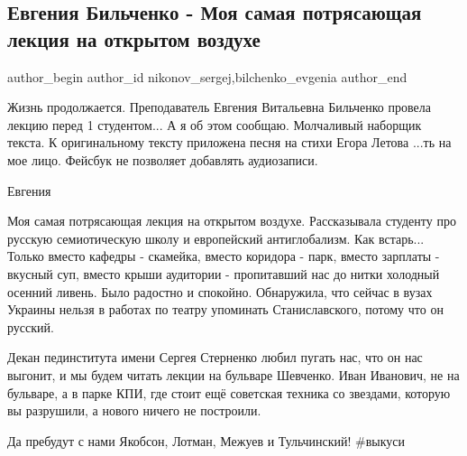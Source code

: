  
 
 
 
 
 
\subsection{Евгения Бильченко -  Моя самая потрясающая лекция на открытом воздухе}
\label{sec:13_09_2021.fb.nikonov_sergej.4.bilchenko_lekcia}
 
\ifcmt
 author_begin
   author_id nikonov_sergej,bilchenko_evgenia
 author_end
\fi

Жизнь продолжается. Преподаватель Евгения Витальевна Бильченко провела лекцию
перед 1 студентом... А я об этом сообщаю. Молчаливый наборщик текста.  К
оригинальному тексту приложена песня на стихи Егора Летова ...ть на мое лицо.
Фейсбук не позволяет добавлять аудиозаписи.

Евгения


Моя самая потрясающая лекция на открытом воздухе. Рассказывала студенту про
русскую семиотическую школу и европейский антиглобализм. Как встарь... Только
вместо кафедры - скамейка, вместо коридора - парк, вместо зарплаты - вкусный
суп, вместо крыши аудитории - пропитавший нас до нитки холодный осенний ливень.
Было радостно и спокойно. Обнаружила, что сейчас в вузах Украины нельзя в
работах по театру упоминать Станиславского, потому что он русский.

Декан пединститута имени Сергея Стерненко любил пугать нас, что он нас выгонит,
и мы будем читать лекции на бульваре Шевченко. Иван Иванович, не на бульваре, а
в парке КПИ, где стоит ещё советская техника со звездами, которую вы разрушили,
а нового ничего не построили.

Да пребудут с нами Якобсон, Лотман, Межуев и Тульчинский! \#выкуси

